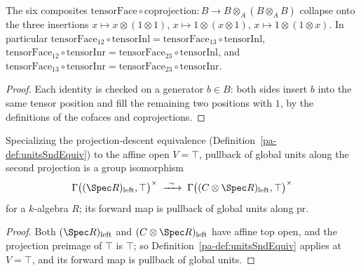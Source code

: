 \begin{lemma}
  \label{pa-lem:tensorFace_comp}
  \leanok

  The six composites \(\mathrm{tensorFace} \circ \mathrm{coprojection} \colon B \to B \otimes_A
  (B \otimes_A B)\) collapse onto the three insertions \(x \mapsto x \otimes (1 \otimes 1)\),
  \(x \mapsto 1 \otimes (x \otimes 1)\), \(x \mapsto 1 \otimes (1 \otimes x)\).  In particular
  \(\mathrm{tensorFace}_{12} \circ \mathrm{tensorInl} = \mathrm{tensorFace}_{13} \circ
  \mathrm{tensorInl}\), \(\mathrm{tensorFace}_{12} \circ \mathrm{tensorInr} =
  \mathrm{tensorFace}_{23} \circ \mathrm{tensorInl}\), and \(\mathrm{tensorFace}_{13} \circ
  \mathrm{tensorInr} = \mathrm{tensorFace}_{23} \circ \mathrm{tensorInr}\).
\end{lemma}
\begin{proof}
  \leanok
  Each identity is checked on a generator \(b \in B\): both sides insert \(b\) into the same
  tensor position and fill the remaining two positions with \(1\), by the definitions of the
  cofaces and coprojections.
\end{proof}

\begin{definition}
  \label{pa-def:unitsSndTopEquiv}
  \leanok

  Specializing the projection-descent equivalence (Definition~\ref{pa-def:unitsSndEquiv}) to the
  affine open \(V = \top\), pullback of global units along the second projection is a group
  isomorphism
  \[
    \Gamma\bigl((\Spec R)_{\mathrm{left}}, \top\bigr)^{\times} \;\xrightarrow{\ \sim\ }\;
    \Gamma\bigl((C \otimes \Spec R)_{\mathrm{left}}, \top\bigr)^{\times}
  \]
  for a \(k\)-algebra \(R\); its forward map is pullback of global units along \(\mathrm{pr}\).
\end{definition}
\begin{proof}
  \leanok
  Both \((\Spec R)_{\mathrm{left}}\) and \((C \otimes \Spec R)_{\mathrm{left}}\) have affine top
  open, and the projection preimage of \(\top\) is \(\top\); so
  Definition~\ref{pa-def:unitsSndEquiv} applies at \(V = \top\), and its forward map is pullback of
  global units.
\end{proof}

